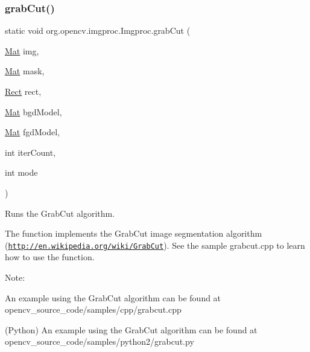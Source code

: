 \subsubsection{\texorpdfstring{grab\+Cut()}{grabCut()}\hspace{0.1cm}{\footnotesize\ttfamily [1/2]}}
{\footnotesize\ttfamily static void org.\+opencv.\+imgproc.\+Imgproc.\+grab\+Cut (\begin{DoxyParamCaption}\item[{\mbox{\hyperlink{classorg_1_1opencv_1_1core_1_1_mat}{Mat}}}]{img,  }\item[{\mbox{\hyperlink{classorg_1_1opencv_1_1core_1_1_mat}{Mat}}}]{mask,  }\item[{\mbox{\hyperlink{classorg_1_1opencv_1_1core_1_1_rect}{Rect}}}]{rect,  }\item[{\mbox{\hyperlink{classorg_1_1opencv_1_1core_1_1_mat}{Mat}}}]{bgd\+Model,  }\item[{\mbox{\hyperlink{classorg_1_1opencv_1_1core_1_1_mat}{Mat}}}]{fgd\+Model,  }\item[{int}]{iter\+Count,  }\item[{int}]{mode }\end{DoxyParamCaption})\hspace{0.3cm}{\ttfamily [static]}}

Runs the Grab\+Cut algorithm.

The function implements the Grab\+Cut image segmentation algorithm (\href{http://en.wikipedia.org/wiki/GrabCut}{\tt http\+://en.\+wikipedia.\+org/wiki/\+Grab\+Cut}). See the sample {\ttfamily grabcut.\+cpp} to learn how to use the function.

Note\+:


\begin{DoxyItemize}
\item An example using the Grab\+Cut algorithm can be found at opencv\+\_\+source\+\_\+code/samples/cpp/grabcut.\+cpp 
\item (Python) An example using the Grab\+Cut algorithm can be found at opencv\+\_\+source\+\_\+code/samples/python2/grabcut.\+py 
\end{DoxyItemize}


